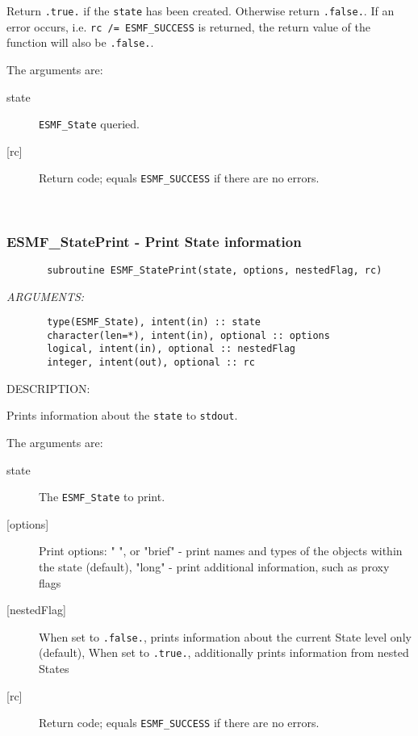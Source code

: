    Return {\tt .true.} if the {\tt state} has been created. Otherwise return
   {\tt .false.}. If an error occurs, i.e. {\tt rc /= ESMF\_SUCCESS} is
   returned, the return value of the function will also be {\tt .false.}.
  
   The arguments are:
   \begin{description}
   \item[state]
   {\tt ESMF\_State} queried.
   \item[{[rc]}]
   Return code; equals {\tt ESMF\_SUCCESS} if there are no errors.
   \end{description}
   
 
\mbox{}\hrulefill\ 
 
\subsubsection [ESMF\_StatePrint] {ESMF\_StatePrint - Print State information}


  
\begin{verbatim}       subroutine ESMF_StatePrint(state, options, nestedFlag, rc)\end{verbatim}{\em ARGUMENTS:}
\begin{verbatim}       type(ESMF_State), intent(in) :: state
       character(len=*), intent(in), optional :: options
       logical, intent(in), optional :: nestedFlag
       integer, intent(out), optional :: rc\end{verbatim}
{\sf DESCRIPTION:\\ }


   Prints information about the {\tt state} to {\tt stdout}.
  
   The arguments are:
   \begin{description}
   \item[state]
   The {\tt ESMF\_State} to print.
   \item[{[options]}]
   Print options:
   " ", or "brief" - print names and types of the objects within the state (default),
   "long" - print additional information, such as proxy flags
   \item[{[nestedFlag]}]
   When set to {\tt .false.}, prints information about the current
   State level only (default),
   When set to {\tt .true.}, additionally prints information from
   nested States
   \item[{[rc]}]
   Return code; equals {\tt ESMF\_SUCCESS} if there are no errors.
   \end{description}
   

